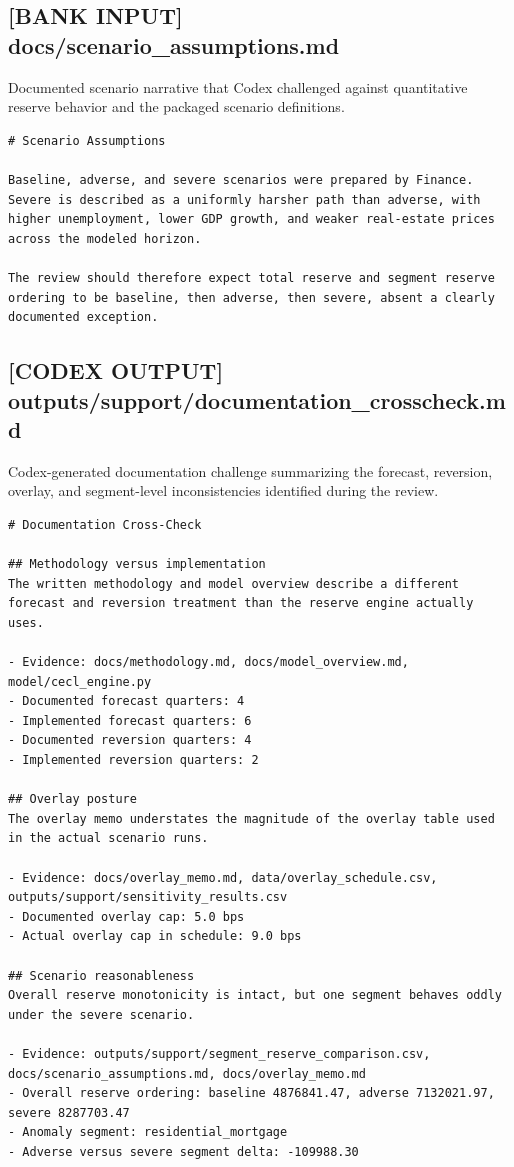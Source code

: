 \documentclass[11pt]{article}
\begin{document}
\subsection*{[BANK INPUT] docs/scenario\_assumptions.md}
Documented scenario narrative that Codex challenged against quantitative reserve behavior and the packaged scenario definitions.
\begin{Verbatim}[fontsize=\small]
# Scenario Assumptions

Baseline, adverse, and severe scenarios were prepared by Finance. Severe is described as a uniformly harsher path than adverse, with higher unemployment, lower GDP growth, and weaker real-estate prices across the modeled horizon.

The review should therefore expect total reserve and segment reserve ordering to be baseline, then adverse, then severe, absent a clearly documented exception.
\end{Verbatim}
\subsection*{[CODEX OUTPUT] outputs/support/documentation\_crosscheck.md}
Codex-generated documentation challenge summarizing the forecast, reversion, overlay, and segment-level inconsistencies identified during the review.
\begin{Verbatim}[fontsize=\small]
# Documentation Cross-Check

## Methodology versus implementation
The written methodology and model overview describe a different forecast and reversion treatment than the reserve engine actually uses.

- Evidence: docs/methodology.md, docs/model_overview.md, model/cecl_engine.py
- Documented forecast quarters: 4
- Implemented forecast quarters: 6
- Documented reversion quarters: 4
- Implemented reversion quarters: 2

## Overlay posture
The overlay memo understates the magnitude of the overlay table used in the actual scenario runs.

- Evidence: docs/overlay_memo.md, data/overlay_schedule.csv, outputs/support/sensitivity_results.csv
- Documented overlay cap: 5.0 bps
- Actual overlay cap in schedule: 9.0 bps

## Scenario reasonableness
Overall reserve monotonicity is intact, but one segment behaves oddly under the severe scenario.

- Evidence: outputs/support/segment_reserve_comparison.csv, docs/scenario_assumptions.md, docs/overlay_memo.md
- Overall reserve ordering: baseline 4876841.47, adverse 7132021.97, severe 8287703.47
- Anomaly segment: residential_mortgage
- Adverse versus severe segment delta: -109988.30
\end{Verbatim}
\end{document}
